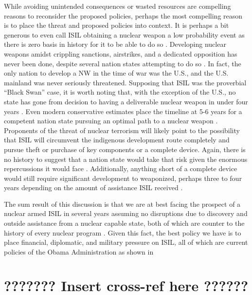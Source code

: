 \documentclass{report}
\begin{document}
While avoiding unintended consequences or wasted resources are compelling reasons to reconsider the proposed policies, perhaps the most compelling reason is to place the threat and proposed policies into context.  It is perhaps a bit generous to even call ISIL obtaining a nuclear weapon a low probability event as there is zero basis in history for it to be able to do so \cite{pollack2014unthinkable,Bracken2013,Reed2010,Agency2004}. Developing nuclear weapons amidst crippling sanctions, airstrikes, and a dedicated opposition has never been done, despite several nation states attempting to do so \cite{Reed2010,Agency2004}.  In fact, the only nation to develop a NW in the time of war was the U.S., and the U.S. mainland was never seriously threatened. Supposing that ISIL was the proverbial \enquote{Black Swan} case, it is worth noting that, with the exception of the U.S., no state has gone from decision to having a deliverable nuclear weapon in under four years \cite{Reed2010}. Even modern conservative estimates place the timeline at 5-6 years for a competent nation state pursuing an optimal path to a nuclear weapon \cite{Harney2006}. Proponents of the threat of nuclear terrorism will likely point to the possibility that ISIL will circumvent the indigenous development route completely and pursue theft or purchase of key components or a complete device.  Again, there is no history to suggest that a nation state would take that risk given the enormous repercussions it would face \cite{pollack2014unthinkable}.  Additionally, anything short of a complete device would still require significant development to weaponized, perhaps three to four years depending on the amount of assistance ISIL received \cite{Harney2006}.  

The sum result of this discussion is that we are at best facing the prospect of a nuclear armed ISIL in several years assuming no disruptions due to discovery and outside assistance from a nuclear capable state, both of which are counter to the history of every nuclear program \cite{pollack2014unthinkable,Reed2010}.  Given this fact, the best policy we have is to place financial, diplomatic, and military pressure on ISIL, all of which are current policies of the Obama Administration as shown in 

\section{??????? Insert cross-ref here ??????}
\end{document}
